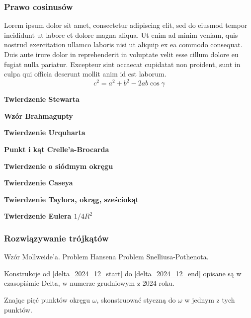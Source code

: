 \subsubsection{Prawo cosinusów}
Lorem ipsum dolor sit amet, consectetur adipiscing elit, sed do eiusmod tempor incididunt ut labore et dolore magna aliqua. Ut enim ad minim veniam, quis nostrud exercitation ullamco laboris nisi ut aliquip ex ea commodo consequat. Duis aute irure dolor in reprehenderit in voluptate velit esse cillum dolore eu fugiat nulla pariatur. Excepteur sint occaecat cupidatat non proident, sunt in culpa qui officia deserunt mollit anim id est laborum.
$$c^2 = a^2 + b^2 - 2ab \cos \gamma$$

\textbf{Twierdzenie Stewarta}

\textbf{Wzór Brahmagupty}

\textbf{Twierdzenie Urquharta}

\textbf{Punkt i kąt Crelle'a-Brocarda}

\textbf{Twierdzenie o siódmym okręgu}

\textbf{Twierdzenie Caseya}

\textbf{Twierdzenie Taylora, okrąg, sześciokąt}

\textbf{Twierdzenie Eulera $1/4R^2$}


\subsubsection{Rozwiązywanie trójkątów}
Wzór Mollweide'a.
%
Problem Hansena
%
Problem Snelliusa-Pothenota.
%



Konstrukcje od \ref{delta_2024_12_start} do \ref{delta_2024_12_end} opisane są w czasopiśmie Delta, w numerze grudniowym z 2024 roku.

\begin{geoconstruction}
    \label{delta_2024_12_start}
    Znając pięć punktów okręgu $\omega$, skonstruować styczną do $\omega$ w jednym z tych punktów.
\end{geoconstruction}

